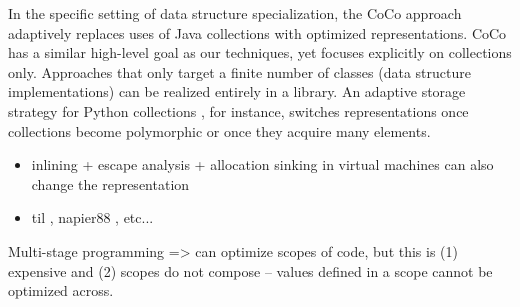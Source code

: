 In the specific setting of data structure specialization, the CoCo
approach~\cite{Xu:2013:CSA:2524984.2524986} adaptively replaces uses
of Java collections with optimized representations.  CoCo has a
similar high-level goal as our techniques, yet focuses explicitly on
collections only.  Approaches that only target a finite number of
classes (data structure implementations) can be realized entirely in a
library. An adaptive storage strategy for Python collections
\cite{Bolz:2013:SSC:2509136.2509531}, for instance, switches
representations once collections become polymorphic or once they
acquire many elements.






\begin{itemize}

  \item inlining + escape analysis + allocation sinking in virtual machines can also change the representation


  \item til \cite{tarditi-til} \cite{harper-intensional-type-analysis}, napier88 \cite{morrison-napier88}, etc...


\end{itemize}

Multi-stage programming => can optimize scopes of code, but this is (1) expensive and (2) scopes do not compose -- values defined in a scope cannot be optimized across.